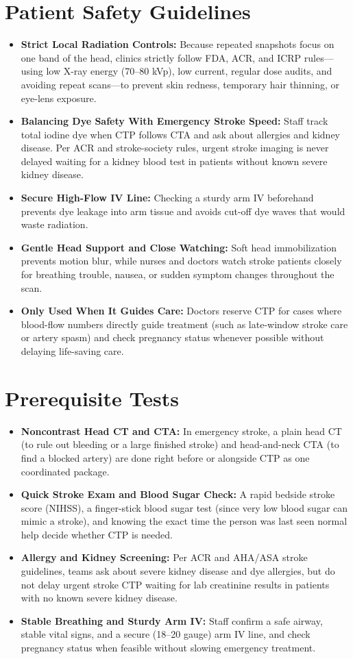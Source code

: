\section{Patient Safety Guidelines}
\begin{itemize}
    \item \textbf{Strict Local Radiation Controls:} Because repeated snapshots focus on one band of the head, clinics strictly follow FDA, ACR, and ICRP rules---using low X-ray energy (70--80 kVp), low current, regular dose audits, and avoiding repeat scans---to prevent skin redness, temporary hair thinning, or eye-lens exposure.
    \item \textbf{Balancing Dye Safety With Emergency Stroke Speed:} Staff track total iodine dye when CTP follows CTA and ask about allergies and kidney disease. Per ACR and stroke-society rules, urgent stroke imaging is never delayed waiting for a kidney blood test in patients without known severe kidney disease.
    \item \textbf{Secure High-Flow IV Line:} Checking a sturdy arm IV beforehand prevents dye leakage into arm tissue and avoids cut-off dye waves that would waste radiation.
    \item \textbf{Gentle Head Support and Close Watching:} Soft head immobilization prevents motion blur, while nurses and doctors watch stroke patients closely for breathing trouble, nausea, or sudden symptom changes throughout the scan.
    \item \textbf{Only Used When It Guides Care:} Doctors reserve CTP for cases where blood-flow numbers directly guide treatment (such as late-window stroke care or artery spasm) and check pregnancy status whenever possible without delaying life-saving care.
\end{itemize}

\section{Prerequisite Tests}
\begin{itemize}
    \item \textbf{Noncontrast Head CT and CTA:} In emergency stroke, a plain head CT (to rule out bleeding or a large finished stroke) and head-and-neck CTA (to find a blocked artery) are done right before or alongside CTP as one coordinated package.
    \item \textbf{Quick Stroke Exam and Blood Sugar Check:} A rapid bedside stroke score (NIHSS), a finger-stick blood sugar test (since very low blood sugar can mimic a stroke), and knowing the exact time the person was last seen normal help decide whether CTP is needed.
    \item \textbf{Allergy and Kidney Screening:} Per ACR and AHA/ASA stroke guidelines, teams ask about severe kidney disease and dye allergies, but do not delay urgent stroke CTP waiting for lab creatinine results in patients with no known severe kidney disease.
    \item \textbf{Stable Breathing and Sturdy Arm IV:} Staff confirm a safe airway, stable vital signs, and a secure (18--20 gauge) arm IV line, and check pregnancy status when feasible without slowing emergency treatment.
\end{itemize}

